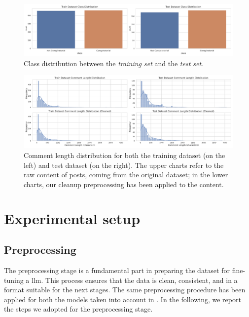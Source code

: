 \documentclass[11pt]{article}
\begin{document}
\begin{figure}
  \centering
  \includegraphics[width=\textwidth]{figures/class_distribution.pdf}
  \caption{
    Class distribution between the \emph{training set} and the \emph{test set}.
  }
  \label{fig:class-frequency}
\end{figure}

\begin{figure}[bp]
  \centering
  \includegraphics[width=\textwidth]{figures/comment_length_distribution.pdf}
  \caption{
    Comment length distribution for both the training dataset (on the left) and test dataset
    (on the right).
    The upper charts refer to the raw content of posts, coming from the original dataset;
    in the lower charts, our cleanup preprocessing has been applied to the content.
  }
  \label{fig:words-distribution}
\end{figure}

\section{Experimental setup}\label{sec:experimental-setup}

\subsection{Preprocessing}\label{sec:preprocessing}
The preprocessing stage is a fundamental part in preparing the dataset for fine-tuning a \ac{llm}.
%
This process ensures that the data is clean, consistent, and in a format suitable for the next stages.
%
The same preprocessing procedure has been applied for both the models taken into account in .
%
In the following,
we report the steps we adopted for the preprocessing stage.
\end{document}
